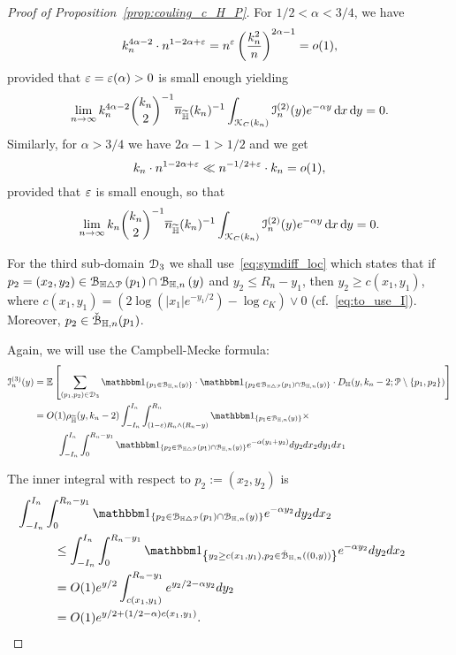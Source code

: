 \begin{proof}[Proof of Proposition~\ref{prop:couling_c_H_P}]
For $1/2 < \alpha < 3/4$, we have
\[
	k_n^{4 \alpha -2} \cdot  n^{1-2\alpha + \varepsilon} = n^{\varepsilon} \left( \frac{k_n^2}{n}\right)^{2\alpha -1} = o(1),
\]
provided that $\varepsilon = \varepsilon (\alpha)>0$ is small enough yielding
\[
	\lim_{n \to \infty} k_n^{4\alpha - 2}  {k_n \choose 2}^{-1} \overline{n}_{\widetilde{\mathbb{H}}}(k_n)^{-1} 
			\int_{{\mathcal K}_{C}(k_n)}\mathcal{I}_n^{(2)}(y) e^{-\alpha y} \operatorname{\mathrm{d}\hspace{-2pt}} x \operatorname{\mathrm{d}\hspace{-2pt}} y = 0.
\]
Similarly, for $\alpha > 3/4$ we have $2\alpha -1 > 1/2$ and we get
\[
	k_n \cdot n^{1-2\alpha + \varepsilon} \ll n^{-1/2 + \varepsilon}  \cdot k_n  = o(1),
\]
provided that $\varepsilon$ is small enough, so that
\[
	\lim_{n \to \infty} k_n  {k_n \choose 2}^{-1} \overline{n}_{\widetilde{\mathbb{H}}}(k_n)^{-1} 
			\int_{{\mathcal K}_{C}(k_n)} \mathcal{I}_n^{(2)}(y) e^{-\alpha y} \operatorname{\mathrm{d}\hspace{-2pt}} x \operatorname{\mathrm{d}\hspace{-2pt}} y = 0.
\]

For the third sub-domain $\mathcal{D}_{3}$ we shall use~\eqref{eq:symdiff_loc} which states that if 
$p_2=(x_2,y_2) \in {\mathcal B}_{\mathbb{H} \bigtriangleup {\mathcal P}}\left(p_1\right)\cap {\mathcal B}_{\mathbb{H},n}\left(y\right)$ and $y_2\leq R_n - y_1$, then 
$y_2 \geq c(x_1,y_1)$, where $c(x_1,y_1) = \left(2 \log(|x_1|e^{-y_1/2}) - \log c_K \right) \vee 0$ (cf.~\eqref{eq:to_use_I}). Moreover, $p_2 \in \check{{\mathcal B}}_{\mathbb{H},n}(p_1)$.


Again, we will use the Campbell-Mecke formula: 
\begin{align*}
	\mathcal{I}_n^{(3)}(y) &= \Exp { \sum_{(p_1,p_2)  \in \dom{3}} 
		\ind{p_1 \in \BallHyp{y}} \cdot \ind{p_2 \in \BallSym{p_1} \cap \BallHyp{y}}
		\cdot D_\H (y,k_n-2;\Pcal \setminus \{ p_1, p_2\})} \\
	&= O(1) \rho_{\HP}(y,k_n-2) \int_{-I_n}^{I_n} \int_{(1-\eps) R_n \wedge (R_n-y)}^{R_n} \ind{p_1 \in \BallHyp{y}}
		\times\\
	&\hspace{25pt} \int_{-I_n}^{I_n} \int_{0}^{R_n-y_1} 
		\ind{p_2 \in \BallSym{p_1} \cap \BallHyp{y}} 
		e^{-\alpha(y_1 + y_2)} dy_2 dx_2 dy_1 dx_1 \\
\end{align*}

The inner integral with respect to $p_2 := (x_2,y_2)$ is 
\begin{align*}
	&\hspace{-30pt} \int_{-I_n}^{I_n} \int_{0}^{R_n - y_1}  \ind{p_2 \in \BallSym{p_1}\cap \BallHyp{y}}  
		e^{-\alpha y_2} dy_2 dx_2\\
	&\leq \int_{-I_n}^{I_n} \int_{0}^{R_n-y_1}  \ind{y_2 \geq c(x_1,y_1), p_2 \in \FatBallHyp{(0,y)}}  
		e^{-\alpha y_2} dy_2 dx_2 \\
	&= O(1) e^{y/2} \int_{c(x_1,y_1)}^{R_n - y_1} e^{y_2/2 - \alpha y_2} dy_2 \\
	&= O(1) e^{y/2 + (1/2 -\alpha) c(x_1,y_1)}.
\end{align*}


\end{proof}
